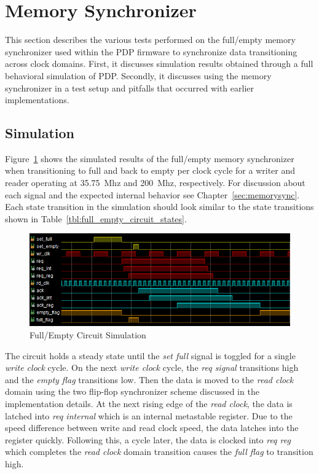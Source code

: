 
\label{chap:experimental_results}



\section{Memory Synchronizer}

    This section describes the various tests performed on the full/empty memory synchronizer used within the PDP firmware to synchronize data transitioning across clock domains. First, it discusses simulation results obtained through a full behavioral simulation of PDP. Secondly, it discusses using the memory synchronizer in a test setup and pitfalls that occurred with earlier implementations.

    \subsection{Simulation}
        Figure~\ref{fig:full_empty_sim} shows the simulated results of the full/empty memory synchronizer when transitioning to full and back to empty per clock cycle for a writer and reader operating at \mbox{35.75 Mhz} and \mbox{200 Mhz}, respectively. For discussion about each signal and the expected internal behavior see Chapter~\ref{sec:memorysync}. Each state transition in the simulation should look similar to the state transitions shown in Table~\ref{tbl:full_empty_circuit_states}.

        \begin{figure}[t]
            \centering
            \includegraphics[width=1.0\textwidth]{fig/full_empty_sim.png}
            \caption{Full/Empty Circuit Simulation}
            \label{fig:full_empty_sim}
        \end{figure}

        The circuit holds a steady state until the {\it set full} signal is toggled for a single {\it write clock} cycle. On the next {\it write clock} cycle, the {\it req signal} transitions high and the {\it empty flag} transitions low. Then the data is moved to the {\it read clock} domain using the two flip-flop synchronizer scheme discussed in the implementation details. At the next rising edge of the {\it read clock}, the data is latched into {\it req internal} which is an internal metastable register. Due to the speed difference between write and read clock speed, the data latches into the register quickly. Following this, a cycle later, the data is clocked into {\it req reg} which completes the {\it read clock} domain transition causes the {\it full flag} to transition high.

